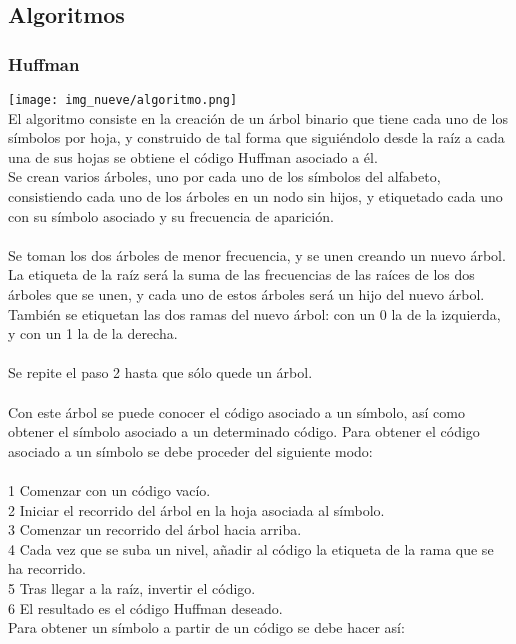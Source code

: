 \documentclass[12pt,twoside]{article}
\begin{document}
\subsection{Algoritmos} 
\subsubsection{Huffman}
\texttt{[image: img\_nueve/algoritmo.png]}
\\
El algoritmo consiste en la creación de un árbol binario que tiene cada uno de los símbolos por hoja, y construido de tal forma que siguiéndolo desde la raíz a cada una de sus hojas se obtiene el código Huffman asociado a él.\\

Se crean varios árboles, uno por cada uno de los símbolos del alfabeto, consistiendo cada uno de los árboles en un nodo sin hijos, y etiquetado cada uno con su símbolo asociado y su frecuencia de aparición.\\
\\
Se toman los dos árboles de menor frecuencia, y se unen creando un nuevo árbol. La etiqueta de la raíz será la suma de las frecuencias de las raíces de los dos árboles que se unen, y cada uno de estos árboles será un hijo del nuevo árbol. También se etiquetan las dos ramas del nuevo árbol: con un 0 la de la izquierda, y con un 1 la de la derecha.\\
\\
Se repite el paso 2 hasta que sólo quede un árbol.\\
\\
Con este árbol se puede conocer el código asociado a un símbolo, así como obtener el símbolo asociado a un determinado código.
Para obtener el código asociado a un símbolo se debe proceder del siguiente modo:\\
\\
1 Comenzar con un código vacío.\\
2 Iniciar el recorrido del árbol en la hoja asociada al símbolo.\\
3 Comenzar un recorrido del árbol hacia arriba.\\
4 Cada vez que se suba un nivel, añadir al código la etiqueta de la rama que se ha recorrido.\\
5 Tras llegar a la raíz, invertir el código.\\
6 El resultado es el código Huffman deseado.\\
Para obtener un símbolo a partir de un código se debe hacer así:
\\
\end{document}
